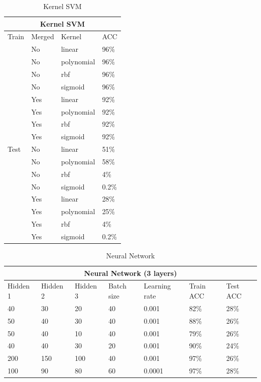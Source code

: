 \documentclass[17pt]{article}
\begin{document}
\begin{table}[]
	\caption{Kernel SVM}
	\centering
	\label{SVMTable}
	\begin{tabular}{|l|l|l|l|}
		\hline
		\multicolumn{4}{|c|}{Kernel SVM}\\
		\cline{1-4}
		\hline
		Train & Merged & Kernel & ACC \\
		\cline{2-4}
		&    No      &   linear    & 96\%  \\
		\cline{2-4}
		&    No      &   polynomial     & 96\% \\
		\cline{2-4}
     	&    No      &   rbf     & 96\%\\
        \cline{2-4}
		&    No      &   sigmoid     & 96\%\\
		\cline{2-4}
		&    Yes      &   linear    & 92\%  \\
		\cline{2-4}
		&    Yes      &   polynomial     & 92\% \\
		\cline{2-4}
		&    Yes      &   rbf     & 92\%\\
		\cline{2-4}
		&    Yes      &   sigmoid     & 92\%\\
		\hline
		Test &    No      &   linear    & 51\%  \\
		\cline{2-4}
		&    No      &   polynomial     & 58\% \\
		\cline{2-4}
		&    No      &   rbf     & 4\%\\
		\cline{2-4}
		&    No      &   sigmoid     & 0.2\%\\
         \cline{2-4}
         &    Yes      &   linear    & 28\%  \\
        \cline{2-4}
        &    Yes      &   polynomial     & 25\% \\
        \cline{2-4}
        &    Yes      &   rbf     & 4\%\\
        \cline{2-4}
        &    Yes      &   sigmoid     & 0.2\%\\
		\hline
	\end{tabular}
\end{table}
\begin{table}
	\centering
	\caption{Neural Network}
	\label{NN}
	\begin{tabular}{|l|l|l|l|l|l|l|}
		\hline
		\multicolumn{7}{|c|}{Neural Network (3 layers)}\\
		\hline
		Hidden 1 & Hidden 2 & Hidden 3 & Batch size & Learning rate & Train ACC & Test ACC\\
		\hline
		40 & 30 & 20 & 40 & 0.001 & 82\% & 28\%\\
		\hline
		50 & 40 & 30 & 40 & 0.001 & 88\% & 26\%\\
		\hline
		50 & 40 & 10 & 40 & 0.001 & 79\% & 26\%\\
		\hline
		40 & 40 & 30 & 20 & 0.001 & 90\% & 24\%\\
		\hline
		200 & 150 & 100 & 40 & 0.001 & 97\% & 26\%\\
		\hline
		100 & 90 & 80 & 60 & 0.0001 & 97\% & 28\%\\
		\hline
	\end{tabular}
\end{table}
\end{document}

